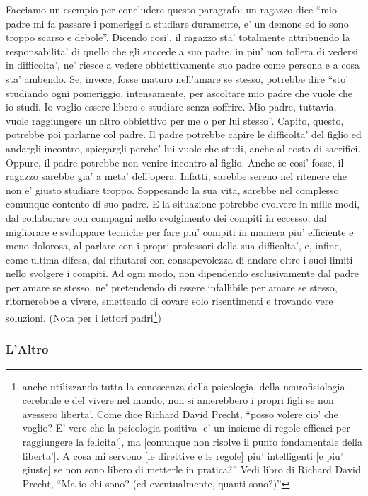 Facciamo un esempio per concludere questo paragrafo: un ragazzo dice ``mio padre mi fa passare i pomeriggi a studiare duramente, e' un demone ed io sono troppo scarso e debole''. Dicendo cosi', il ragazzo sta' totalmente attribuendo la responsabilita' di quello che gli succede a suo padre, in piu' non tollera di vedersi in difficolta', ne' riesce a vedere obbiettivamente suo padre come persona e a cosa sta' ambendo. Se, invece, fosse maturo nell'amare se stesso, potrebbe dire ``sto' studiando ogni pomeriggio, intensamente, per ascoltare mio padre che vuole che io studi. Io voglio essere libero e studiare senza soffrire. Mio padre, tuttavia, vuole raggiungere un altro obbiettivo per me o per lui stesso''.  Capito, questo, potrebbe poi parlarne col padre. Il padre potrebbe capire le difficolta' del figlio ed andargli incontro, spiegargli perche' lui vuole che studi, anche al costo di sacrifici. Oppure, il padre potrebbe non venire incontro al figlio. Anche se cosi' fosse, il ragazzo sarebbe gia' a meta' dell'opera. Infatti, sarebbe sereno nel ritenere che non e' giusto studiare troppo. Soppesando la sua vita, sarebbe nel complesso comunque contento di suo padre. E la situazione potrebbe evolvere in mille modi, dal collaborare con compagni nello svolgimento dei compiti in eccesso,  dal migliorare e sviluppare tecniche per fare piu' compiti in maniera piu' efficiente e meno dolorosa, al parlare con i propri professori della sua difficolta', e, infine, come ultima difesa, dal rifiutarsi con consapevolezza di andare oltre i suoi limiti nello svolgere i compiti. Ad ogni modo, non dipendendo esclusivamente dal padre per amare se stesso, ne' pretendendo di essere infallibile per amare se stesso, ritornerebbe a vivere, smettendo di covare solo risentimenti e trovando vere soluzioni. (Nota per i lettori padri\footnote{anche utilizzando tutta la conoscenza della psicologia, della neurofisiologia cerebrale e del vivere nel mondo, non si amerebbero i propri figli se non avessero liberta'. Come dice Richard David Precht, ``posso volere cio' che voglio? E' vero che la psicologia-positiva [e' un insieme di regole efficaci per raggiungere la felicita'], ma [comunque non risolve il punto fondamentale della liberta']. A cosa mi servono [le direttive e le regole] piu' intelligenti [e piu' giuste] se non sono libero di metterle in pratica?'' Vedi libro di Richard David Precht, ``Ma io chi sono? (ed eventualmente, quanti sono?)''})

\subsubsection{L'Altro}
\label{altrui}

